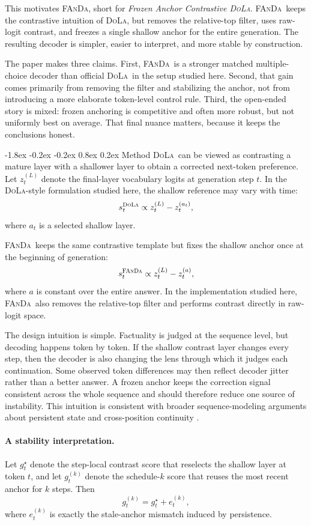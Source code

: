 \documentclass[10pt,twocolumn]{article}
\makeatletter
\newcommand{\fanda}{\textsc{FAnDa}}
\newcommand{\dola}{\textsc{DoLa}}
\renewcommand\section{\@startsection{section}{1}{\z@}%
  {-1.8ex \@plus -0.2ex \@minus -0.2ex}%
  {0.8ex \@plus 0.2ex}%
  {\large\bfseries}}
\makeatother
\begin{document}
This motivates \fanda, short for \emph{Frozen Anchor Contrastive \dola}. \fanda\ keeps the contrastive intuition of \dola, but removes the relative-top filter, uses raw-logit contrast, and freezes a single shallow anchor for the entire generation. The resulting decoder is simpler, easier to interpret, and more stable by construction.

The paper makes three claims. First, \fanda\ is a stronger matched multiple-choice decoder than official \dola\ in the setup studied here. Second, that gain comes primarily from removing the filter and stabilizing the anchor, not from introducing a more elaborate token-level control rule. Third, the open-ended story is mixed: frozen anchoring is competitive and often more robust, but not uniformly best on average. That final nuance matters, because it keeps the conclusions honest.

\section{Method}
\dola\ can be viewed as contrasting a mature layer with a shallower layer to obtain a corrected next-token preference. Let $z_t^{(L)}$ denote the final-layer vocabulary logits at generation step $t$. In the \dola-style formulation studied here, the shallow reference may vary with time:
\[
s_t^{\text{\dola}} \propto z_t^{(L)} - z_t^{(a_t)},
\]
where $a_t$ is a selected shallow layer.

\fanda\ keeps the same contrastive template but fixes the shallow anchor once at the beginning of generation:
\[
s_t^{\text{\fanda}} \propto z_t^{(L)} - z_t^{(a)},
\]
where $a$ is constant over the entire answer. In the implementation studied here, \fanda\ also removes the relative-top filter and performs contrast directly in raw-logit space.

The design intuition is simple. Factuality is judged at the sequence level, but decoding happens token by token. If the shallow contrast layer changes every step, then the decoder is also changing the lens through which it judges each continuation. Some observed token differences may then reflect decoder jitter rather than a better answer. A frozen anchor keeps the correction signal consistent across the whole sequence and should therefore reduce one source of instability. This intuition is consistent with broader sequence-modeling arguments about persistent state and cross-position continuity \cite{attention,qwen25}.

\paragraph{A stability interpretation.}
Let $g_t^\star$ denote the step-local contrast score that reselects the shallow layer at token $t$, and let $g_t^{(k)}$ denote the schedule-$k$ score that reuses the most recent anchor for $k$ steps. Then
\[
g_t^{(k)} = g_t^\star + e_t^{(k)},
\]
where $e_t^{(k)}$ is exactly the stale-anchor mismatch induced by persistence.
\end{document}
